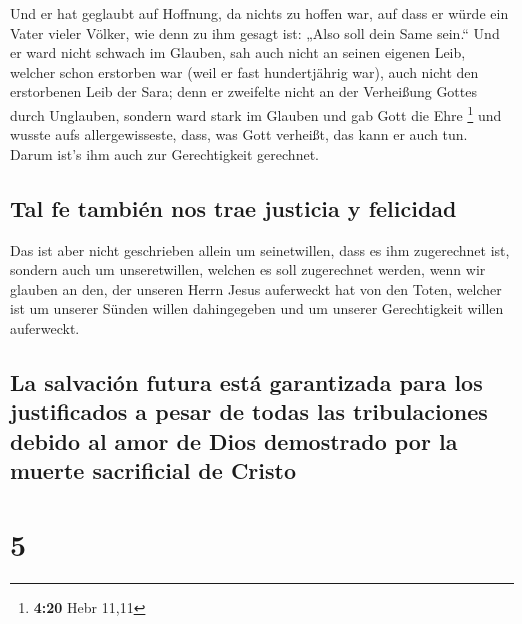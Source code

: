  Und er hat geglaubt auf Hoffnung, da nichts zu hoffen
war, auf dass er würde ein Vater vieler Völker, wie denn zu ihm gesagt
ist: „Also soll dein Same sein.``  Und er ward nicht
schwach im Glauben, sah auch nicht an seinen eigenen Leib, welcher schon
erstorben war (weil er fast hundertjährig war), auch nicht den
erstorbenen Leib der Sara;  denn er zweifelte nicht an
der Verheißung Gottes durch Unglauben, sondern ward stark im Glauben und
gab Gott die Ehre \footnote{\textbf{4:20} Hebr 11,11} 
und wusste aufs allergewisseste, dass, was Gott verheißt, das kann er
auch tun.  Darum ist's ihm auch zur Gerechtigkeit
gerechnet.

\hypertarget{tal-fe-tambiuxe9n-nos-trae-justicia-y-felicidad}{%
\subsection{Tal fe también nos trae justicia y
felicidad}\label{tal-fe-tambiuxe9n-nos-trae-justicia-y-felicidad}}

 Das ist aber nicht geschrieben allein um seinetwillen,
dass es ihm zugerechnet ist,  sondern auch um
unseretwillen, welchen es soll zugerechnet werden, wenn wir glauben an
den, der unseren Herrn Jesus auferweckt hat von den Toten,
 welcher ist um unserer Sünden willen dahingegeben und um
unserer Gerechtigkeit willen auferweckt.

\hypertarget{la-salvaciuxf3n-futura-estuxe1-garantizada-para-los-justificados-a-pesar-de-todas-las-tribulaciones-debido-al-amor-de-dios-demostrado-por-la-muerte-sacrificial-de-cristo}{%
\subsection{La salvación futura está garantizada para los justificados a
pesar de todas las tribulaciones debido al amor de Dios demostrado por
la muerte sacrificial de
Cristo}\label{la-salvaciuxf3n-futura-estuxe1-garantizada-para-los-justificados-a-pesar-de-todas-las-tribulaciones-debido-al-amor-de-dios-demostrado-por-la-muerte-sacrificial-de-cristo}}

\hypertarget{section-4}{%
\section{5}\label{section-4}}

